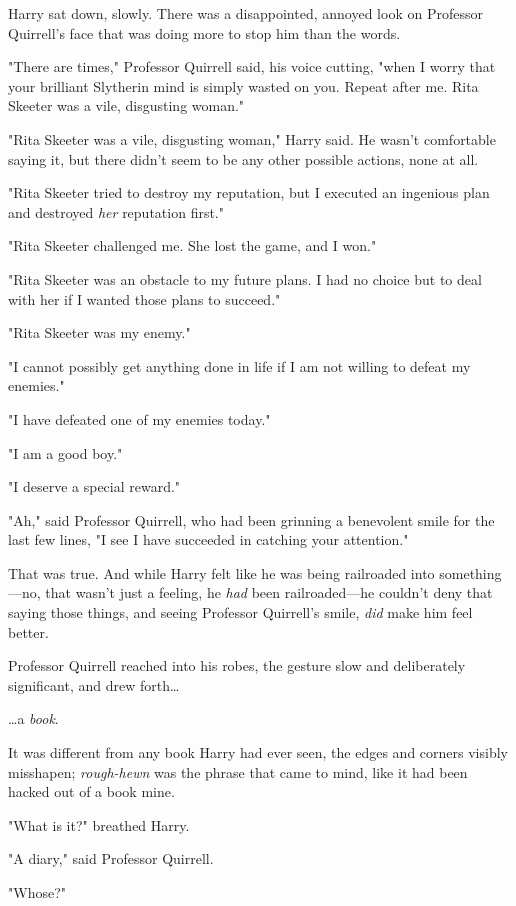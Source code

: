 Harry sat down, slowly. There was a disappointed, annoyed look on Professor 
Quirrell's face that was doing more to stop him than the words.

"There are times," Professor Quirrell said, his voice cutting, "when I worry 
that your brilliant Slytherin mind is simply wasted on you. Repeat after me. 
Rita Skeeter was a vile, disgusting woman."

"Rita Skeeter was a vile, disgusting woman," Harry said. He wasn't comfortable 
saying it, but there didn't seem to be any other possible actions, none at all.

"Rita Skeeter tried to destroy my reputation, but I executed an ingenious plan 
and destroyed \emph{her} reputation first."

"Rita Skeeter challenged me. She lost the game, and I won."

"Rita Skeeter was an obstacle to my future plans. I had no choice but to deal 
with her if I wanted those plans to succeed."

"Rita Skeeter was my enemy."

"I cannot possibly get anything done in life if I am not willing to defeat my 
enemies."

"I have defeated one of my enemies today."

"I am a good boy."

"I deserve a special reward."

"Ah," said Professor Quirrell, who had been grinning a benevolent smile for the 
last few lines, "I see I have succeeded in catching your attention."

That was true. And while Harry felt like he was being railroaded into 
something---no, that wasn't just a feeling, he \emph{had} been railroaded---he 
couldn't deny that saying those things, and seeing Professor Quirrell's smile, 
\emph{did} make him feel better.

Professor Quirrell reached into his robes, the gesture slow and deliberately 
significant, and drew forth{\ldots}

{\ldots}a \emph{book}.

It was different from any book Harry had ever seen, the edges and corners 
visibly misshapen; \emph{rough-hewn} was the phrase that came to mind, like it 
had been hacked out of a book mine.

"What is it?" breathed Harry.

"A diary," said Professor Quirrell.

"Whose?"

